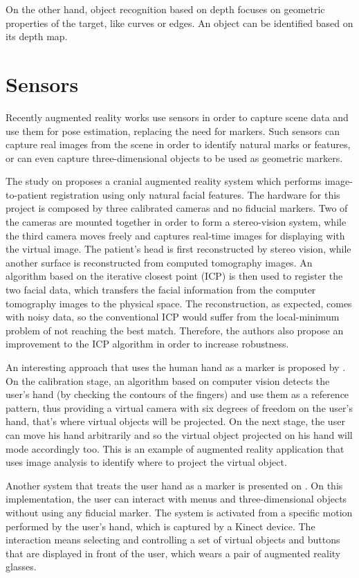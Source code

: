 \documentclass[msc, a4paper, classic, en]{ufbathesis}
\begin{document}
On the other hand, object recognition based on depth focuses on geometric properties of the target, like curves or edges. An object can be identified based on its depth map.

\section{Sensors}

Recently augmented reality works use sensors in order to capture scene data and use them for pose estimation, replacing the need for markers. Such sensors can capture real images from the scene in order to identify natural marks or features, or can even capture three-dimensional objects to be used as geometric markers.

The study on \cite{Lee20125286} proposes a cranial augmented reality system which performs image-to-patient registration using only natural facial features. The hardware for this project is composed by three calibrated cameras and no fiducial markers. Two of the cameras are mounted together in order to form a stereo-vision system, while the third camera moves freely and captures real-time images for displaying with the virtual image. The patient's head is first reconstructed by stereo vision, while another surface is reconstructed from computed tomography images. An algorithm based on the iterative closest point (ICP) is then used to register the two facial data, which transfers the facial information from the computer tomography images to the physical space. The reconstruction, as expected, comes with noisy data, so the conventional ICP would suffer from the local-minimum problem of not reaching the best match. Therefore, the authors also propose an improvement to the ICP algorithm in order to increase robustness.

An interesting approach that uses the human hand as a marker is proposed by \cite{4373785}. On the calibration stage, an algorithm based on computer vision detects the user's hand (by checking the contours of the fingers) and use them as a reference pattern, thus providing a virtual camera with six degrees of freedom on the user's hand, that's where virtual objects will be projected. On the next stage, the user can move his hand arbitrarily and so the virtual object projected on his hand will mode accordingly too. This is an example of augmented reality application that uses image analysis to identify where to project the virtual object.

Another system that treats the user hand as a marker is presented on \cite{51078809}. On this implementation, the user can interact with menus and three-dimensional objects without using any fiducial marker. The system is activated from a specific motion performed by the user's hand, which is captured by a Kinect device. The interaction means selecting and controlling a set of virtual objects and buttons that are displayed in front of the user, which wears a pair of augmented reality glasses. 
\end{document}
